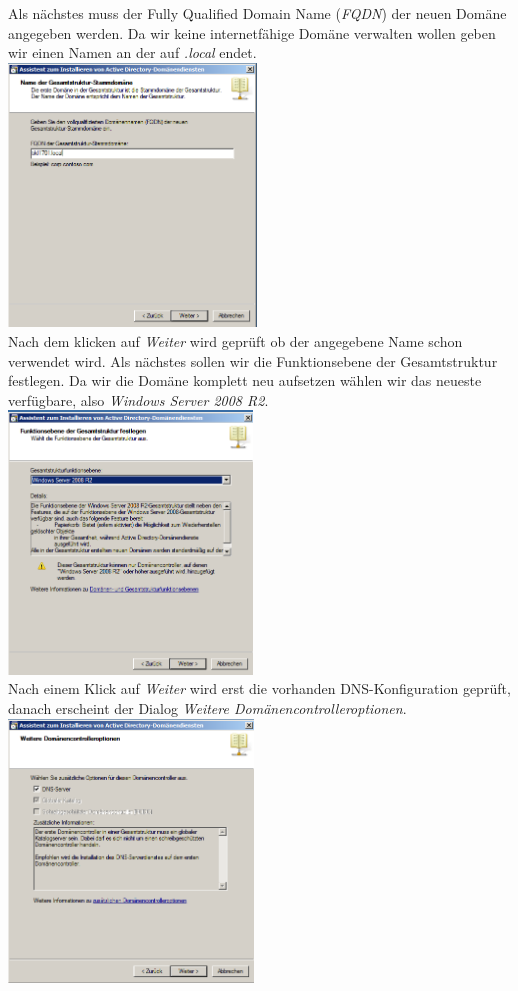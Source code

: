\documentclass[12pt,a4paper,titlepage]{scrartcl} %
\begin{document}
Als nächstes muss der Fully Qualified Domain Name (\emph{FQDN}) der neuen Domäne angegeben werden. Da wir keine internetfähige Domäne verwalten wollen geben wir einen Namen an der auf \emph{.local} endet.\\

	\includegraphics[height=7cm]{Bilder/017(dcpromo_exe04)}\\
		
Nach dem klicken auf \emph{Weiter} wird geprüft ob der angegebene Name schon verwendet wird. Als nächstes sollen wir die Funktionsebene der Gesamtstruktur festlegen. Da wir die Domäne komplett neu aufsetzen wählen wir das neueste verfügbare, also \emph{Windows Server 2008 R2}.\\

	\includegraphics[height=7cm]{Bilder/019(dcpromo_exe06)}\\
	
Nach einem Klick auf \emph{Weiter} wird erst die vorhanden DNS-Konfiguration geprüft, danach erscheint der Dialog \emph{Weitere Domänencontrolleroptionen}.\\

	\includegraphics[height=7cm]{Bilder/021(dcpromo_exe08)}\\
\end{document}
